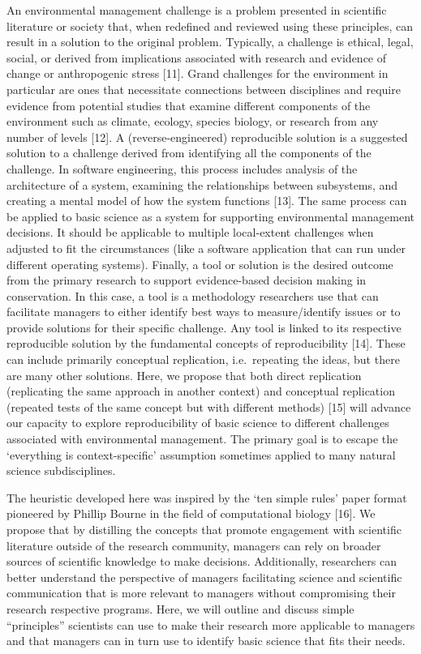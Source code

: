 \documentclass[10pt,letterpaper]{article}
\begin{document}
An environmental management challenge is a problem presented in
scientific literature or society that, when redefined and reviewed using
these principles, can result in a solution to the original problem.
Typically, a challenge is ethical, legal, social, or derived from
implications associated with research and evidence of change or
anthropogenic stress {[}11{]}. Grand challenges for the environment in
particular are ones that necessitate connections between disciplines and
require evidence from potential studies that examine different
components of the environment such as climate, ecology, species biology,
or research from any number of levels {[}12{]}. A (reverse-engineered)
reproducible solution is a suggested solution to a challenge derived
from identifying all the components of the challenge. In software
engineering, this process includes analysis of the architecture of a
system, examining the relationships between subsystems, and creating a
mental model of how the system functions {[}13{]}. The same process can
be applied to basic science as a system for supporting environmental
management decisions. It should be applicable to multiple local-extent
challenges when adjusted to fit the circumstances (like a software
application that can run under different operating systems). Finally, a
tool or solution is the desired outcome from the primary research to
support evidence-based decision making in conservation. In this case, a
tool is a methodology researchers use that can facilitate managers to
either identify best ways to measure/identify issues or to provide
solutions for their specific challenge. Any tool is linked to its
respective reproducible solution by the fundamental concepts of
reproducibility {[}14{]}. These can include primarily conceptual
replication, i.e.~repeating the ideas, but there are many other
solutions. Here, we propose that both direct replication (replicating
the same approach in another context) and conceptual replication
(repeated tests of the same concept but with different methods) {[}15{]}
will advance our capacity to explore reproducibility of basic science to
different challenges associated with environmental management. The
primary goal is to escape the `everything is context-specific'
assumption sometimes applied to many natural science subdisciplines.

The heuristic developed here was inspired by the `ten simple rules'
paper format pioneered by Phillip Bourne in the field of computational
biology {[}16{]}. We propose that by distilling the concepts that
promote engagement with scientific literature outside of the research
community, managers can rely on broader sources of scientific knowledge
to make decisions. Additionally, researchers can better understand the
perspective of managers facilitating science and scientific
communication that is more relevant to managers without compromising
their research respective programs. Here, we will outline and discuss
simple ``principles'' scientists can use to make their research more
applicable to managers and that managers can in turn use to identify
basic science that fits their needs.
\end{document}

